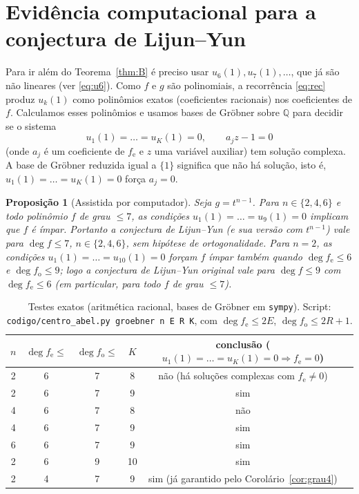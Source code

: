 \documentclass[11pt]{article}
\theoremstyle{plain}
\newtheorem{proposition}[theorem]{Proposição}
\theoremstyle{definition}
\theoremstyle{remark}
\newcommand{\Q}{\mathbb{Q}}
\newcommand{\fe}{f_{\mathrm e}}
\newcommand{\fo}{f_{\mathrm o}}
\begin{document}
\section{Evidência computacional para a conjectura de Lijun--Yun}\label{sec:comp}

Para ir além do Teorema~\ref{thm:B} é preciso usar $u_6(1),u_7(1),\dots$, que já
são não lineares (ver \eqref{eq:u6}). Como $f$ e $g$ são polinomiais, a
recorrência \eqref{eq:rec} produz $u_k(1)$ como polinômios exatos (coeficientes
racionais) nos coeficientes de $f$. Calculamos esses polinômios e usamos bases de
Gröbner sobre $\Q$ para decidir se o sistema
\[
 u_1(1)=\dots=u_K(1)=0,\qquad a_jz-1=0
\]
(onde $a_j$ é um coeficiente de $\fe$ e $z$ uma variável auxiliar) tem solução
complexa. A base de Gröbner reduzida igual a $\{1\}$ significa que não há
solução, isto é, $u_1(1)=\dots=u_K(1)=0$ força $a_j=0$.

\begin{proposition}[Assistida por computador]\label{prop:comp}
Seja $g=t^{n-1}$. Para $n\in\{2,4,6\}$ e todo polinômio $f$ de grau $\le7$, as
condições $u_1(1)=\dots=u_9(1)=0$ implicam que $f$ é ímpar. Portanto a
conjectura de Lijun--Yun (e sua versão com $t^{n-1}$) vale para $\deg f\le 7$,
$n\in\{2,4,6\}$, \emph{sem} hipótese de ortogonalidade. Para $n=2$, as
condições $u_1(1)=\dots=u_{10}(1)=0$ forçam $f$ ímpar também quando $\deg\fe\le6$ e
$\deg\fo\le9$; logo a conjectura de Lijun--Yun original vale para $\deg f\le9$
com $\deg\fe\le6$ (em particular, para todo $f$ de grau $\le7$).
\end{proposition}

\begin{table}[h]
\centering
\begin{tabular}{@{}cccccc@{}}
\toprule
$n$ & $\deg\fe\le$ & $\deg\fo\le$ & $K$ & conclusão ($u_1(1)=\dots=u_K(1)=0\Rightarrow\fe=0$) \\
\midrule
2 & 6 & 7 & 8 & não (há soluções complexas com $\fe\ne0$) \\
2 & 6 & 7 & 9 & sim \\
4 & 6 & 7 & 8 & não \\
4 & 6 & 7 & 9 & sim \\
6 & 6 & 7 & 9 & sim \\
2 & 6 & 9 & 10 & sim \\
2 & 4 & 7 & 9 & sim (já garantido pelo Corolário~\ref{cor:grau4}) \\
\bottomrule
\end{tabular}
\caption{Testes exatos (aritmética racional, bases de Gröbner em
\texttt{sympy}). Script: \texttt{codigo/centro\_abel.py groebner n E R K}, com
$\deg\fe\le2E$, $\deg\fo\le2R+1$.}
\label{tab:comp}
\end{table}
\end{document}

